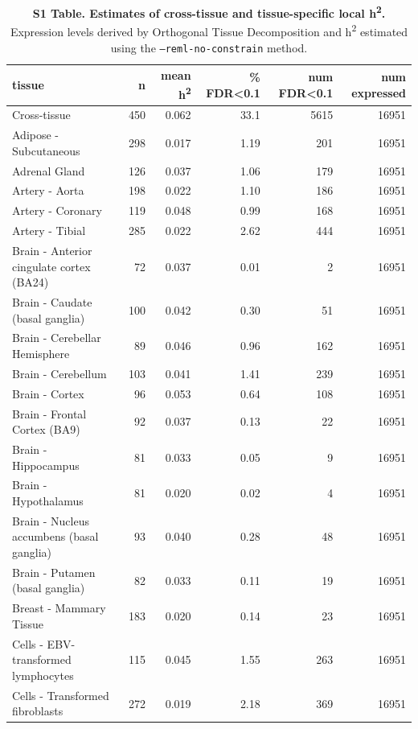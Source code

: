 \documentclass[10pt,letterpaper]{article}
\begin{document}
\begin{table}[!ht]
\begin{adjustwidth}{-2.25in}{0in} %
\caption*{{\bf S1 Table. Estimates of cross-tissue and tissue-specific local h\textsuperscript{2}.} Expression levels derived by Orthogonal Tissue Decomposition and h\textsuperscript{2} estimated using the \texttt{--reml-no-constrain} method.}
\centering
\begin{tabular}{lrrrrr}
  \hline
tissue & n & mean h\textsuperscript{2} & \% FDR\textless{}0.1 & num FDR\textless{}0.1 & num expressed \\ 
  \hline
Cross-tissue & 450 & 0.062 & 33.1 & 5615 & 16951 \\ 
  Adipose - Subcutaneous & 298 & 0.017 & 1.19 & 201 & 16951 \\ 
  Adrenal Gland & 126 & 0.037 & 1.06 & 179 & 16951 \\ 
  Artery - Aorta & 198 & 0.022 & 1.10 & 186 & 16951 \\ 
  Artery - Coronary & 119 & 0.048 & 0.99 & 168 & 16951 \\ 
  Artery - Tibial & 285 & 0.022 & 2.62 & 444 & 16951 \\ 
  Brain - Anterior cingulate cortex (BA24) & 72 & 0.037 & 0.01 & 2 & 16951 \\ 
  Brain - Caudate (basal ganglia) & 100 & 0.042 & 0.30 & 51 & 16951 \\ 
  Brain - Cerebellar Hemisphere & 89 & 0.046 & 0.96 & 162 & 16951 \\ 
  Brain - Cerebellum & 103 & 0.041 & 1.41 & 239 & 16951 \\ 
  Brain - Cortex & 96 & 0.053 & 0.64 & 108 & 16951 \\ 
  Brain - Frontal Cortex (BA9) & 92 & 0.037 & 0.13 & 22 & 16951 \\ 
  Brain - Hippocampus & 81 & 0.033 & 0.05 & 9 & 16951 \\ 
  Brain - Hypothalamus & 81 & 0.020 & 0.02 & 4 & 16951 \\ 
  Brain - Nucleus accumbens (basal ganglia) & 93 & 0.040 & 0.28 & 48 & 16951 \\ 
  Brain - Putamen (basal ganglia) & 82 & 0.033 & 0.11 & 19 & 16951 \\ 
  Breast - Mammary Tissue & 183 & 0.020 & 0.14 & 23 & 16951 \\ 
  Cells - EBV-transformed lymphocytes & 115 & 0.045 & 1.55 & 263 & 16951 \\ 
  Cells - Transformed fibroblasts & 272 & 0.019 & 2.18 & 369 & 16951 \\ 

\end{tabular}
\end{adjustwidth}
\end{table}
\end{document}

